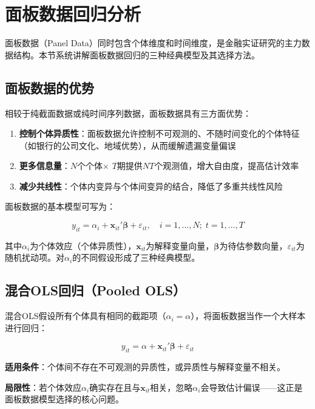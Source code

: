 \section{面板数据回归分析}
\label{sec:panel}

面板数据（Panel Data）同时包含个体维度和时间维度，是金融实证研究的主力数据结构。本节系统讲解面板数据回归的三种经典模型及其选择方法。

\subsection{面板数据的优势}

相较于纯截面数据或纯时间序列数据，面板数据具有三方面优势：

\begin{enumerate}[leftmargin=2em]
  \item \textbf{控制个体异质性}：面板数据允许控制不可观测的、不随时间变化的个体特征（如银行的公司文化、地域优势），从而缓解遗漏变量偏误
  \item \textbf{更多信息量}：$N$个个体$\times$ $T$期提供$NT$个观测值，增大自由度，提高估计效率
  \item \textbf{减少共线性}：个体内变异与个体间变异的结合，降低了多重共线性风险
\end{enumerate}

面板数据的基本模型可写为：

\[
y_{it} = \alpha_i + \mathbf{x}_{it}'\boldsymbol{\beta} + \varepsilon_{it}, \quad i=1,\ldots,N;\; t=1,\ldots,T
\]

其中$\alpha_i$为个体效应（个体异质性），$\mathbf{x}_{it}$为解释变量向量，$\boldsymbol{\beta}$为待估参数向量，$\varepsilon_{it}$为随机扰动项。对$\alpha_i$的不同假设形成了三种经典模型。

\subsection{混合OLS回归（Pooled OLS）}

混合OLS假设所有个体具有相同的截距项（$\alpha_i = \alpha$），将面板数据当作一个大样本进行回归：

\[
y_{it} = \alpha + \mathbf{x}_{it}'\boldsymbol{\beta} + \varepsilon_{it}
\]

\textbf{适用条件}：个体间不存在不可观测的异质性，或异质性与解释变量不相关。

\textbf{局限性}：若个体效应$\alpha_i$确实存在且与$\mathbf{x}_{it}$相关，忽略$\alpha_i$会导致估计偏误——这正是面板数据模型选择的核心问题。

